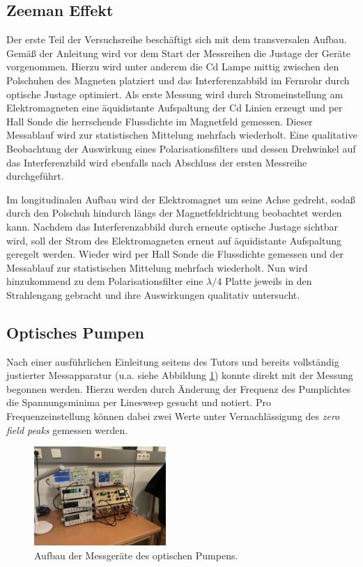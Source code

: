 \documentclass[../main.tex]{subfiles}
\begin{document}
    \subsection{Zeeman Effekt}
        Der erste Teil der Versuchsreihe beschäftigt sich mit dem transversalen Aufbau. Gemäß der Anleitung wird vor dem Start der Messreihen die Justage der Geräte vorgenommen. Hierzu wird unter anderem die Cd Lampe mittig zwischen den Polschuhen des Magneten platziert und das Interferenzabbild im Fernrohr durch optische Justage optimiert. Als erste Messung wird durch Stromeinstellung am Elektromagneten eine äquidistante Aufspaltung der Cd Linien erzeugt und per Hall Sonde die herrschende Flussdichte im Magnetfeld gemessen. Dieser Messablauf wird zur statistischen Mittelung mehrfach wiederholt. Eine qualitative Beobachtung der Auswirkung eines Polarisationsfilters und dessen Drehwinkel auf das Interferenzbild wird ebenfalls nach Abschluss der ersten Messreihe durchgeführt.

        Im longitudinalen Aufbau wird der Elektromagnet um seine Achse gedreht, sodaß durch den Polschuh hindurch längs der Magnetfeldrichtung beobachtet werden kann. Nachdem das Interferenzabbild durch erneute optische Justage sichtbar wird, soll der Strom des Elektromagneten erneut auf äquidistante Aufspaltung geregelt werden. Wieder wird per Hall Sonde die Flussdichte gemessen und der Messablauf zur statistischen Mittelung mehrfach wiederholt. Nun wird hinzukommend zu dem Polarisationsfilter eine $\lambda/4$ Platte jeweils in den Strahlengang gebracht und ihre Auswirkungen qualitativ untersucht. 


    \subsection{Optisches Pumpen}
        Nach einer ausführlichen Einleitung seitens des Tutors und bereits vollständig justierter Messapparatur (u.a. siehe Abbildung \ref{fig:OptPumpMessgeraete}) konnte direkt mit der Messung begonnen werden. Hierzu werden durch Änderung der Frequenz des Pumplichtes die Spannungsminima per Linesweep gesucht und notiert. Pro Frequenzeinstellung können dabei zwei Werte unter Vernachlässigung des \emph{zero field peaks} gemessen werden. 
        \begin{figure}[H]
            \centering
            \includegraphics[width=5cm]{Bilddateien/Durchfuehrung/522CFA29-C4DF-4BB6-8FFD-C183A9990129_1_105_c.jpeg}
            \caption{Aufbau der Messgeräte des optischen Pumpens.}
            \label{fig:OptPumpMessgeraete}
        \end{figure}

   
\end{document}

